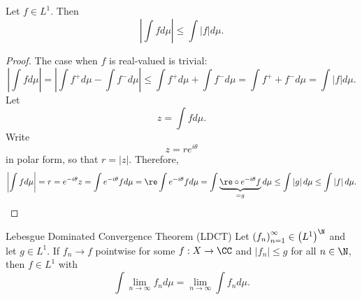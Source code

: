 \documentclass[pmath451]{subfiles}
\begin{document}
    \begin{prop}{}
        Let $f\in L^1$. Then
        \begin{equation*}
            \left| \int fd\mu \right| \leq \int \left| f \right|d\mu.
        \end{equation*}
    \end{prop}

    \begin{proof}
        The case when $f$ is real-valued is trivial:
        \begin{equation*}
            \left| \int fd\mu \right| = \left| \int f^+d\mu - \int f^-d\mu \right| \leq \int f^+d\mu + \int f^-d\mu = \int f^++f^-d\mu = \int\left| f \right|d\mu.
        \end{equation*}
        Let
        \begin{equation*}
            z = \int fd\mu.
        \end{equation*}
        Write
        \begin{equation*}
            z = re^{i\theta}
        \end{equation*}
        in polar form, so that $r = \left| z \right|$. Therefore,
        \begin{equation*}
            \left| \int fd\mu \right| = r = e^{-i\theta}z = \int e^{-i\theta}fd\mu = \re\int e^{-i\theta}fd\mu 
            = \int \underbrace{\re\circ e^{-i\theta}f}_{=g}d\mu \leq \int \left| g \right|d\mu \leq \int\left| f \right|d\mu.
        \end{equation*}
    \end{proof}
    
    \begin{theorem}{Lebesgue Dominated Convergence Theorem (LDCT)}
        Let $\left( f_{n} \right)^{\infty}_{n=1}\in \left( L^1 \right)^{\N}$ and let $g\in L^1$. If $f_n\to f$ pointwise for some $f:X\to\CC$ and $\left| f_n \right|\leq g$ for all $n\in\N$, then $f\in L^1$ with
        \begin{equation*}
            \int\lim_{n\to\infty}f_nd\mu = \lim_{n\to\infty}\int f_nd\mu.
        \end{equation*}
    \end{theorem}
    
\end{document}

